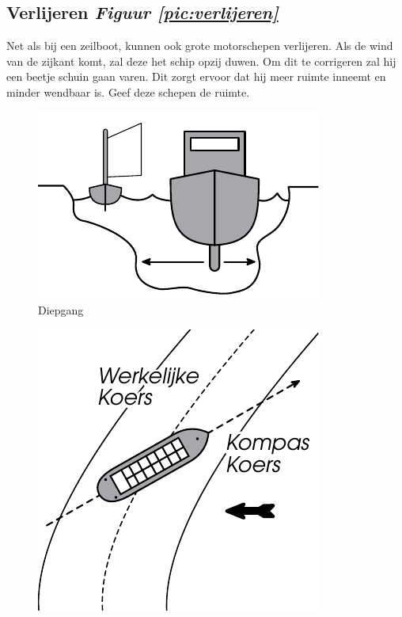 \subsection{Verlijeren  \hfill \textit{Figuur \ref{pic:verlijeren}}}
Net als bij een zeilboot, kunnen ook grote motorschepen verlijeren. Als de wind van de zijkant komt, zal deze het schip opzij duwen. Om dit te corrigeren zal hij een beetje schuin gaan varen. Dit zorgt ervoor dat hij meer ruimte inneemt en minder wendbaar is. Geef deze schepen de ruimte. 

  \begin{center}
  \begin{minipage}[b]{0.35\textwidth}
    \begin{figure}[H]
        \includegraphics[width=\textwidth]{Hoofdstukken/Veiligheid/pdf/diepgang.pdf}
        \caption{Diepgang}
        \label{pic:diepgang}
    \end{figure}
  \end{minipage}
    \hspace{2cm}
  \begin{minipage}[b]{0.35\textwidth}
  \begin{figure}[H]
        \includegraphics[width=\textwidth]{Hoofdstukken/Veiligheid/pdf/verlijeren.pdf}

\end{figure}
\end{minipage}
\end{center}

